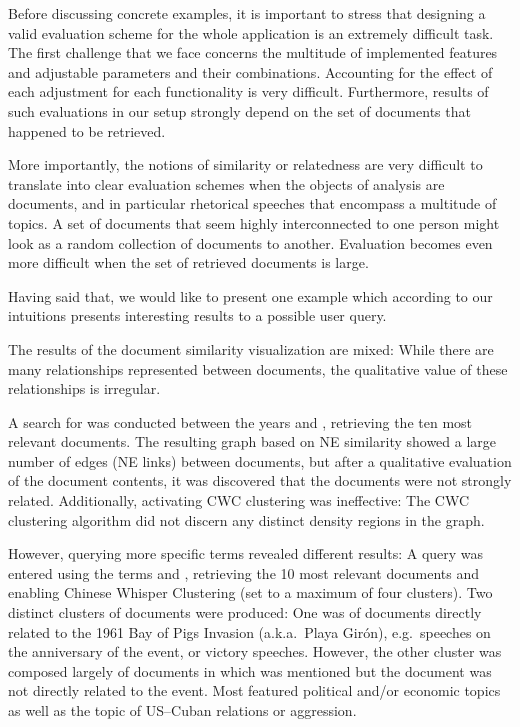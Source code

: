 Before discussing concrete examples, it is important to stress that designing a valid evaluation scheme for the whole application is an extremely difficult task. The first challenge that we face concerns the multitude of implemented features and adjustable parameters and their combinations. Accounting for the effect of each adjustment for each functionality is very difficult. Furthermore, results of such evaluations in our setup strongly depend on the set of documents that happened to be retrieved.   

More importantly, the notions of similarity or relatedness are very difficult to translate into clear evaluation schemes when the objects of analysis are documents, and in particular rhetorical speeches that encompass a multitude of topics. A set of documents that seem highly interconnected to one person might look as a random collection of documents to another. Evaluation becomes even more difficult when the set of retrieved documents is large. 

Having said that, we would like to present one example which according to our intuitions presents interesting results to a possible user query.

The results of the document similarity visualization are mixed: While there are many relationships represented between documents, the qualitative value of these relationships is irregular.

A search for  was conducted between the years  and , retrieving the ten most relevant documents. The resulting graph based on NE similarity showed a large number of 
edges (NE links) between documents, but after a qualitative evaluation of the document contents, it was discovered that the documents were not strongly related. Additionally, activating CWC clustering was ineffective: The CWC clustering algorithm did not discern any distinct density regions in the graph.

However, querying more specific terms revealed different results: A query was entered using the terms  and , retrieving the 10 most relevant documents and enabling Chinese Whisper Clustering (set to a maximum of four clusters). Two distinct clusters of documents were produced: One was of documents directly related to the 1961 Bay of Pigs Invasion (a.k.a.\ Playa Gir\'{o}n), e.g.\ speeches on the anniversary of the event, or victory speeches. However, the other cluster was composed largely of documents in which  was mentioned but the document was not directly related to the event. Most featured political and/or economic topics as well as the topic of US--Cuban relations or aggression.

